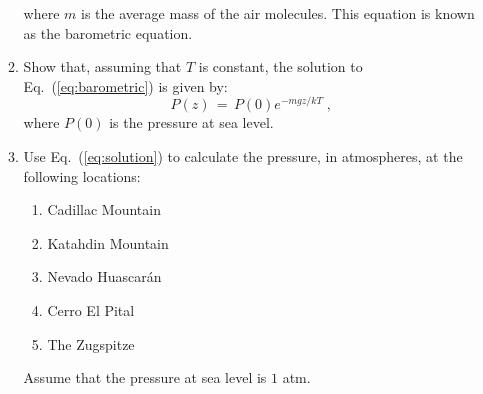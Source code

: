 \documentclass[12pt]{article}
\begin{document}
\begin{enumerate}
\begin{enumerate}
        where $m$ is the average mass of the air molecules.  This
        equation is known as the barometric equation.
      \item Show that, assuming that $T$ is constant, the solution to
        Eq.~(\ref{eq:barometric}) is given by:
        \begin{equation}
          P(z) \, = \, P(0) e^{-mgz/kT} \;,
          \label{eq:solution}
          \end{equation}
        where $P(0)$ is the pressure at sea level.
      \item Use Eq.~(\ref{eq:solution}) to calculate the pressure, in
        atmospheres, at the following locations:
        \begin{enumerate}
        \item Cadillac Mountain
        \item Katahdin Mountain
        \item Nevado Huascar\'an
        \item Cerro El Pital
        \item The Zugspitze
        \end{enumerate}
        Assume that the pressure at sea level is $1$ atm. 
    \end{enumerate}

\end{enumerate}
\end{document}
